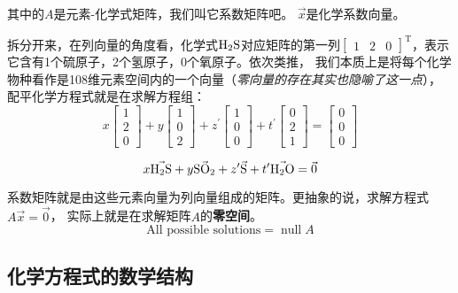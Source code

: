 \documentclass{ctexart}
\DeclareMathOperator{\nullspace}{null}
\begin{document}
其中的\(A\)是元素-化学式矩阵，我们叫它系数矩阵吧。 \(\vec{x}\)是化学系数向量。

拆分开来，在列向量的角度看，化学式\(\ce{H2S}\)对应矩阵的第一列\(
    \begin{bmatrix}1 & 2 & 0
\end{bmatrix}^{\mathrm{T}}\)，表示它含有1个硫原子，2个氢原子，0个氧原子。依次类推，
我们本质上是将每个化学物种看作是108维元素空间内的一个向量（\textit{零向量的存在其实也隐喻了这一点}），
配平化学方程式就是在求解方程组：
\[
    x
    \begin{bmatrix}1 \\ 2 \\ 0
    \end{bmatrix} + y
    \begin{bmatrix}1 \\ 0 \\ 2
    \end{bmatrix} + z^\prime
    \begin{bmatrix}1 \\ 0 \\ 0
    \end{bmatrix} + t^\prime
    \begin{bmatrix}0 \\ 2 \\ 1
    \end{bmatrix} =
    \begin{bmatrix}0 \\ 0 \\ 0
    \end{bmatrix}
\]

\[
    x \vec{\ce{H2S}} + y \vec{\ce{SO2}} + z^\prime \vec{\ce{S}} +
    t^\prime \vec{\ce{H2O}} = \vec{0}
\]

系数矩阵就是由这些元素向量为列向量组成的矩阵。更抽象的说，求解方程式\(A\vec{x} = \vec{0}\)，
实际上就是在求解矩阵\(A\)的\textbf{零空间}。
\[
    \text{All possible solutions} = \nullspace{A}
\]

\subsection{化学方程式的数学结构}
\end{document}
